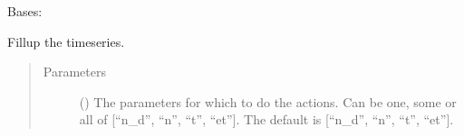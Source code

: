 \documentclass[letterpaper,10pt,english]{sphinxmanual}
\begin{document}
\begin{fulllineitems}
\label{\detokenize{weatherDB:weatherDB.broker.Broker}}
\sphinxAtStartPar
Bases: 

\begin{fulllineitems}
\label{\detokenize{weatherDB:weatherDB.broker.Broker.__init__}}
\end{fulllineitems}


\begin{fulllineitems}
\label{\detokenize{weatherDB:weatherDB.broker.Broker.create_roger_ts}}
\end{fulllineitems}


\begin{fulllineitems}
\label{\detokenize{weatherDB:weatherDB.broker.Broker.fillup}}
\sphinxAtStartPar
Fillup the timeseries.
\begin{quote}\begin{description}
\item[{Parameters}] \leavevmode
\sphinxAtStartPar
{} (\sphinxstyleliteralemphasis{\sphinxupquote{, }}) \textendash{} The parameters for which to do the actions.
Can be one, some or all of {[}“n\_d”, “n”, “t”, “et”{]}.
The default is {[}“n\_d”, “n”, “t”, “et”{]}.

\end{description}\end{quote}


\end{fulllineitems}
\end{fulllineitems}
\end{document}
